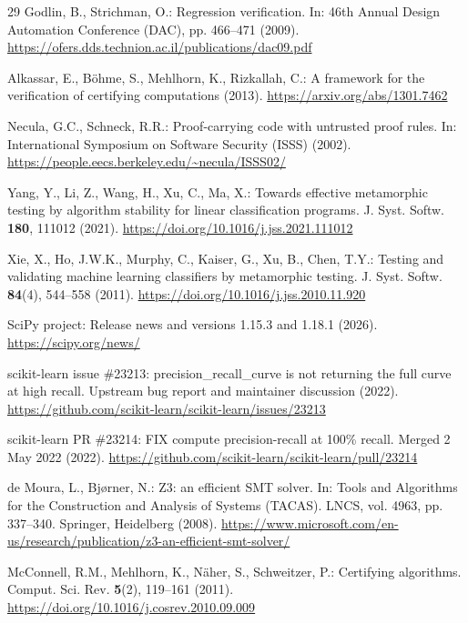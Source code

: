 \documentclass[11pt,a4paper]{article}
\begin{document}
\begin{thebibliography}{29}
Godlin, B., Strichman, O.: Regression verification. In: 46th Annual Design Automation Conference (DAC), pp. 466--471 (2009). \url{https://ofers.dds.technion.ac.il/publications/dac09.pdf}

Alkassar, E., B\"{o}hme, S., Mehlhorn, K., Rizkallah, C.: A framework for the verification of certifying computations (2013). \url{https://arxiv.org/abs/1301.7462}

Necula, G.C., Schneck, R.R.: Proof-carrying code with untrusted proof rules. In: International Symposium on Software Security (ISSS) (2002). \url{https://people.eecs.berkeley.edu/~necula/ISSS02/}

Yang, Y., Li, Z., Wang, H., Xu, C., Ma, X.: Towards effective metamorphic testing by algorithm stability for linear classification programs. J. Syst. Softw. \textbf{180}, 111012 (2021). \url{https://doi.org/10.1016/j.jss.2021.111012}

Xie, X., Ho, J.W.K., Murphy, C., Kaiser, G., Xu, B., Chen, T.Y.: Testing and validating machine learning classifiers by metamorphic testing. J. Syst. Softw. \textbf{84}(4), 544--558 (2011). \url{https://doi.org/10.1016/j.jss.2010.11.920}

SciPy project: Release news and versions 1.15.3 and 1.18.1 (2026). \url{https://scipy.org/news/}

scikit-learn issue \#23213: precision\_recall\_curve is not returning the full curve at high recall. Upstream bug report and maintainer discussion (2022). \url{https://github.com/scikit-learn/scikit-learn/issues/23213}

scikit-learn PR \#23214: FIX compute precision-recall at 100\% recall. Merged 2 May 2022 (2022). \url{https://github.com/scikit-learn/scikit-learn/pull/23214}

de Moura, L., Bj{\o}rner, N.: Z3: an efficient SMT solver. In: Tools and Algorithms for the Construction and Analysis of Systems (TACAS). LNCS, vol. 4963, pp. 337--340. Springer, Heidelberg (2008). \url{https://www.microsoft.com/en-us/research/publication/z3-an-efficient-smt-solver/}

McConnell, R.M., Mehlhorn, K., N\"{a}her, S., Schweitzer, P.: Certifying algorithms. Comput. Sci. Rev. \textbf{5}(2), 119--161 (2011). \url{https://doi.org/10.1016/j.cosrev.2010.09.009}


\end{thebibliography}
\end{document}
